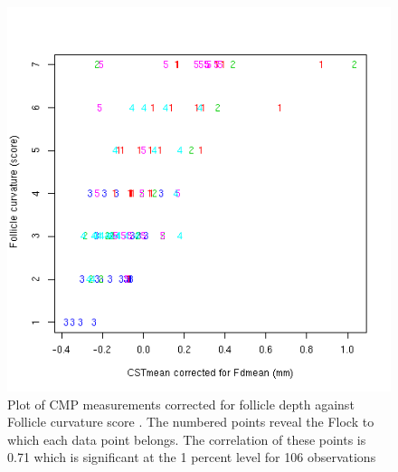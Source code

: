 %

\begin{figure}[!h]
  \centering
  \includegraphics[width=1.0\textwidth]{CSTcFdxFc.png}
  \caption{Plot of CMP measurements corrected for follicle depth against Follicle curvature score . The numbered points reveal the Flock to which each data point belongs. The correlation of these points is 0.71 which is significant at the 1 percent level for 106 observations}
  \label{fig:CSTcFdxFc}
\end{figure}

%

